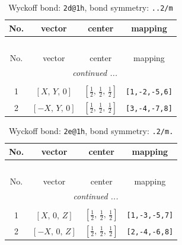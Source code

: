 \documentclass[fleqn,8pt]{jsarticle}
\begin{document}
\renewcommand{\arraystretch}{1.2}
\begin{longtable}{cccc}
\caption{Wyckoff bond: {\tt 2d@1h}, bond symmetry: {\tt ..2/m}}
 \\
 \hline \hline
No. & vector & center & mapping \\ \hline \endfirsthead

\multicolumn{3}{l}{\tablename\ \thetable{}} \\
 \hline \hline
No. & vector & center & mapping \\ \hline \endhead

 \hline \hline
\multicolumn{3}{r}{\footnotesize\it continued ...} \\ \endfoot

 \hline \hline
\multicolumn{3}{r}{} \\ \endlastfoot

1 & $\left[ X,\, Y,\, 0 \right]$ & $\left[ \frac{1}{2},\, \frac{1}{2},\, \frac{1}{2} \right]$ & {\tt [1,-2,-5,6]} \\ \hline
2 & $\left[ - X,\, Y,\, 0 \right]$ & $\left[ \frac{1}{2},\, \frac{1}{2},\, \frac{1}{2} \right]$ & {\tt [3,-4,-7,8]} \\
\end{longtable}
\renewcommand{\arraystretch}{1.2}
\begin{longtable}{cccc}
\caption{Wyckoff bond: {\tt 2e@1h}, bond symmetry: {\tt .2/m.}}
 \\
 \hline \hline
No. & vector & center & mapping \\ \hline \endfirsthead

\multicolumn{3}{l}{\tablename\ \thetable{}} \\
 \hline \hline
No. & vector & center & mapping \\ \hline \endhead

 \hline \hline
\multicolumn{3}{r}{\footnotesize\it continued ...} \\ \endfoot

 \hline \hline
\multicolumn{3}{r}{} \\ \endlastfoot

1 & $\left[ X,\, 0,\, Z \right]$ & $\left[ \frac{1}{2},\, \frac{1}{2},\, \frac{1}{2} \right]$ & {\tt [1,-3,-5,7]} \\ \hline
2 & $\left[ - X,\, 0,\, Z \right]$ & $\left[ \frac{1}{2},\, \frac{1}{2},\, \frac{1}{2} \right]$ & {\tt [2,-4,-6,8]} \\
\end{longtable}
\renewcommand{\arraystretch}{1.2}
\end{document}
